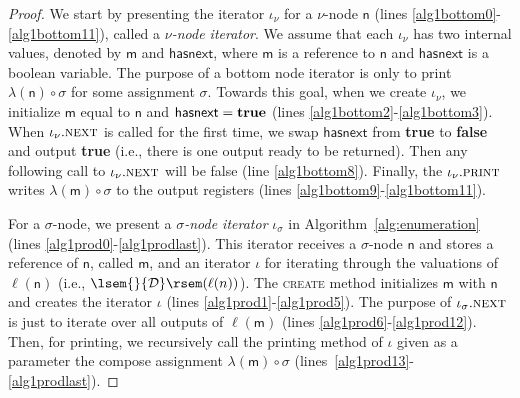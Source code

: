 \documentclass[
a4paper
]{article}
\theoremstyle{plain}
\theoremstyle{definition}
\theoremstyle{remark}
\newcommand{\D}{\mathcal{D}}
\newcommand{\n}{\textsf{n}}
\newcommand{\m}{\textsf{m}}
\newcommand{\hasnext}{\operatorname{hasnext}}
\newcommand{\bnodelabel}{\m}
\newcommand{\uit}{\iota}
\newcommand{\sem}[1]{{\lsem{}{#1}\rsem}}
\renewcommand{\operatorname}[1]{\textsf{#1}}
\begin{document}
\begin{proof}
	
	We start by presenting the iterator $\uit_\nu$ for a  $\nu$-node $\n$ (lines \ref{alg1bottom0}-\ref{alg1bottom11}), called a \emph{ $\nu$-node iterator}. We assume that each $\uit_\nu$ has two internal values, denoted by $\bnodelabel$ and $\hasnext$, where $\bnodelabel$ is a reference to $\n$ and $\hasnext$ is a boolean variable. The purpose of a bottom node iterator is only to print $\lambda(\n) \circ \sigma$ for some assignment $\sigma$. Towards this goal, when we create $\uit_\nu$, we initialize $\bnodelabel$ equal to $\n$ and $\hasnext = {\bf true}$ (lines \ref{alg1bottom2}-\ref{alg1bottom3}). When $\uit_\nu.\textsc{next}$ is called for the first time, we swap $\hasnext$ from {\bf true} to {\bf false} and output {\bf true} (i.e., there is one output ready to be returned). Then any following call to $\uit_\nu.\textsc{next}$ will be false (line \ref{alg1bottom8}). Finally, the $\uit_\nu.\textsc{print}$ writes $\lambda(\bnodelabel) \circ \sigma$ to the output registers (lines \ref{alg1bottom9}-\ref{alg1bottom11}). 
	
	
	For a $\sigma$-node, we present a \emph{$\sigma$-node iterator} $\uit_\sigma$ in Algorithm~\ref{alg:enumeration} (lines \ref{alg1prod0}-\ref{alg1prodlast}). 
	This iterator receives a $\sigma$-node $\n$ and stores a reference of $\n$, called $\bnodelabel$, and an iterator $\uit$ for iterating through the valuations of $\ell(\n)$ (i.e., $\sem{\D}(\ell(n))$). 
	The \textsc{create} method initializes $\bnodelabel$ with $\n$ and creates the iterator $\uit$ (lines \ref{alg1prod1}-\ref{alg1prod5}).
	The purpose of $\uit_\sigma.\textsc{next}$ is just to iterate over all outputs of $\ell(\bnodelabel)$ (lines \ref{alg1prod6}-\ref{alg1prod12}). 
	Then, for printing, we recursively call the printing method of $\uit$ given as a parameter the compose assignment $\lambda(\bnodelabel) \circ \sigma$ (lines~\ref{alg1prod13}-\ref{alg1prodlast}).
	

\end{proof}
\end{document}
